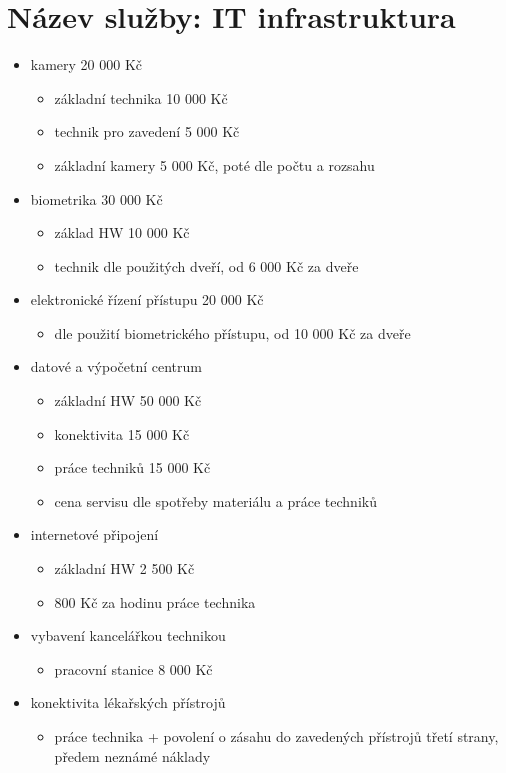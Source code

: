 \documentclass[11pt, a4paper, titlepage]{article}
\begin{document}
	\section*{Název služby: IT infrastruktura}
	\begin{itemize}
		\item kamery 20 000 Kč
		\begin{itemize}
			\item základní technika 10 000 Kč
			\item technik pro zavedení 5 000 Kč
			\item základní kamery 5 000 Kč, poté dle počtu a rozsahu
		\end{itemize}
		\item biometrika 30 000 Kč
		\begin{itemize}
			\item základ HW 10 000 Kč
			\item technik dle použitých dveří, od 6 000 Kč za dveře
		\end{itemize}
		\item elektronické řízení přístupu 20 000 Kč
		\begin{itemize}
			\item dle použití biometrického přístupu, od 10 000 Kč za dveře
		\end{itemize}

		\item datové a výpočetní centrum
		\begin{itemize}
			\item základní HW 50 000 Kč
			\item konektivita 15 000 Kč
			\item práce techniků 15 000 Kč
			\item cena servisu dle spotřeby materiálu a práce techniků
		\end{itemize}

		\item internetové připojení
		\begin{itemize}
			\item základní HW 2 500 Kč
			\item 800 Kč za hodinu práce technika
		\end{itemize}

		\item vybavení kancelářkou technikou
		\begin{itemize}
			\item pracovní stanice 8 000 Kč
		\end{itemize}

		\item konektivita lékařských přístrojů
		\begin{itemize}
			\item práce technika + povolení o zásahu do zavedených přístrojů třetí strany, předem neznámé náklady
		\end{itemize}
	\end{itemize}
\end{document}
